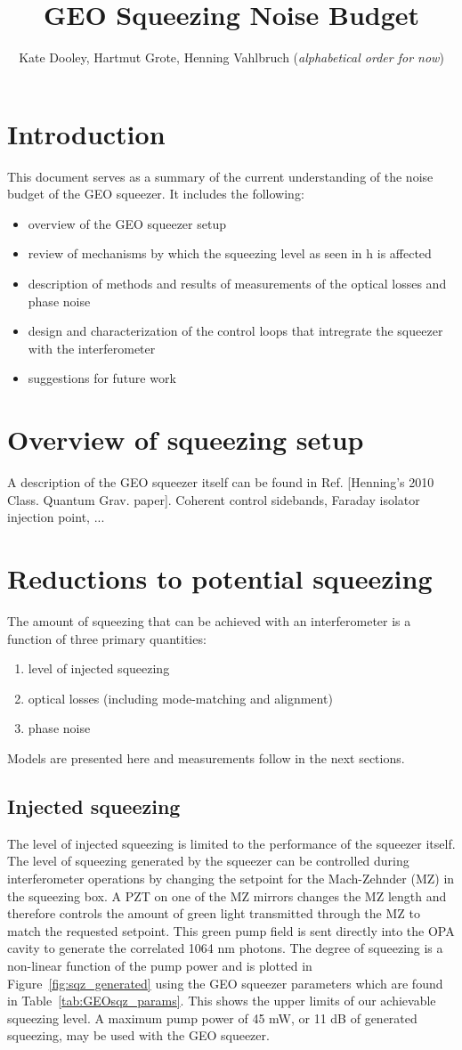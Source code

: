 \documentclass{ligodoc}
\title{GEO Squeezing Noise Budget}
\author{Kate Dooley, Hartmut Grote, Henning Vahlbruch (\emph{alphabetical order for now})}
\begin{document}
\section{Introduction}
This document serves as a summary of the current understanding of the
noise budget of the GEO squeezer. It includes the following:
\begin{itemize}
\item overview of the GEO squeezer setup
\item review of mechanisms by which the squeezing level as seen in h is affected
\item description of methods and results of measurements of the
  optical losses and phase noise
\item design and characterization of the control loops that intregrate
  the squeezer with the interferometer
\item suggestions for future work
\end{itemize}


\section{Overview of squeezing setup}
A description of the GEO squeezer itself can be found in
Ref. [Henning's 2010 Class. Quantum Grav. paper]. Coherent control
sidebands, Faraday isolator injection point, ... 



\section{Reductions to potential squeezing}
The amount of squeezing that can be achieved with an interferometer is
a function of three primary quantities:
\begin{enumerate}
\item level of injected squeezing
\item optical losses (including mode-matching and alignment)
\item phase noise
\end{enumerate}
Models are presented here and measurements follow in the next sections.


\subsection{Injected squeezing}
The level of injected squeezing is limited to the performance of the
squeezer itself. The level of squeezing generated by the squeezer can
be controlled during interferometer operations by changing the
setpoint for the Mach-Zehnder (MZ) in the squeezing box. A PZT on one
of the MZ mirrors changes the MZ length and therefore controls the
amount of green light transmitted through the MZ to match the
requested setpoint. This green pump field is sent directly into the
OPA cavity to generate the correlated 1064 nm photons. The degree of
squeezing is a non-linear function of the pump power and is plotted in
Figure~\ref{fig:sqz_generated} using the GEO squeezer parameters which
are found in Table~\ref{tab:GEOsqz_params}. This shows the upper
limits of our achievable squeezing level. A maximum pump power of 45
mW, or 11 dB of generated squeezing, may be used with the GEO
squeezer.
\end{document}
